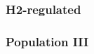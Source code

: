 \subsubsection{H2-regulated}
\label{sec:starform_H2reg}

\subsubsection{Population III}
\label{sec:starform_pop3}








